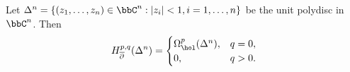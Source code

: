 

    \begin{proposition}\label{prop:dolbeault_cohomology_of_polydisc}
        Let \(\Delta^n = \{(z_1, \ldots, z_n) \in \bbC^n: |z_i| < 1, i=1,\ldots,n\}\) be the unit polydisc in \(\bbC^n\).
        Then
        \[ H^{p,q}_{\overline{\partial}}(\Delta^n) = \begin{cases}
            \Omega_{\hol}^p(\Delta^n), & q=0, \\
            0, & q > 0.
        \end{cases} \]
    \end{proposition}
